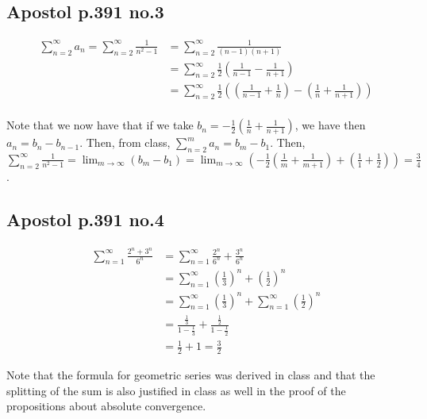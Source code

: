 \documentclass[12pt,letterpaper]{article}
\theoremstyle{definition}
\begin{document}
\subsection*{Apostol p.391 no.3}

\begin{align*}
  \sum_{n = 2}^\infty a_n = \sum_{n = 2}^\infty \frac{1}{n^2 - 1} &= \sum_{n = 2}^\infty \frac{1}{(n-1)(n+1)} \\
                                                                  &= \sum_{n = 2}^\infty \frac{1}{2}(\frac{1}{n-1} - \frac{1}{n+1}) \\
                                                                  &= \sum_{n=2}^\infty\frac{1}{2} ((\frac{1}{n-1} + \frac{1}{n}) - (\frac{1}{n} + \frac{1}{n+1})) \\
\end{align*}

Note that we now have that if we take $b_n = -\frac{1}{2}(\frac{1}{n} + \frac{1}{n+1})$, we
have then $a_n = b_n - b_{n-1}$. Then, from class, $\sum_{n=2}^m a_n = b_m - b_1$. Then,
$\sum_{n=2}^\infty \frac{1}{n^2 - 1} = \lim_{m\rightarrow \infty} (b_m - b_1) = \lim_{m\rightarrow
  \infty} (-\frac{1}{2}(\frac{1}{m} + \frac{1}{m+1}) + (\frac{1}{1} + \frac{1}{2})) = \frac{3}{4}$.

\subsection*{Apostol p.391 no.4}

\begin{align*}
  \sum_{n=1}^\infty \frac{2^n + 3^n}{6^n} &= \sum_{n=1}^\infty \frac{2^n}{6^n} + \frac{3^n}{6^n} \\
                                          &= \sum_{n=1}^\infty (\frac{1}{3})^n + (\frac{1}{2})^n \\
                                          &= \sum_{n=1}^\infty (\frac{1}{3})^n + \sum_{n=1}^\infty(\frac{1}{2})^n \\
                                          &= \frac{\frac{1}{3}}{1 - \frac{1}{3}} + \frac{\frac{1}{2}}{1 - \frac{1}{2}} \\
                                          &= \frac{1}{2} + 1 = \frac{3}{2}
\end{align*}

Note that the formula for geometric series was derived in class and that the
splitting of the sum is also justified in class as well in the proof of the
propositions about absolute convergence.
\end{document}
